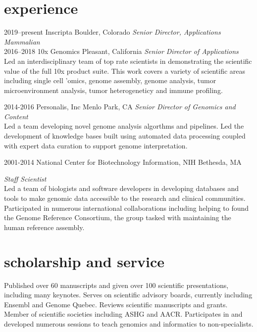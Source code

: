\documentclass[]{dmc-cv} %
\begin{document}
\section{experience}

\begin{entrylist}


\entry
{2019--present}
{Inscripta}
{Boulder, Colorado}
{\emph{Senior Director, Applications Mammalian}}\\

\entry
{2016--2018}
{10x Genomics}
{Pleasant, California}
{\emph{Senior Director of Applications} \\
Led an interdisciplinary team of top rate scientists in demonstrating the scientific value of the full
10x product suite. This work covers a variety of scientific areas including single cell 'omics, genome assembly, genome analysis,
tumor microenvironment analysis, tumor heterogeneticy and immune profiling.
}

\entry
{2014-2016}
{Personalis, Inc}
{Menlo Park, CA}
{\emph{Senior Director of Genomics and Content} \\
Led a team developing novel genome analysis algorthms and pipelines. Led the development of knowledge bases built using automated data processing coupled with expert data curation to support genome interpretation.
}

\entry
{2001-2014}
{National Center for Biotechnology Information, NIH}
{Bethesda, MA}
{\emph{Staff Scientist} \\
Led a team of biologists and software developers in developing databases and tools to make genomic data accessible to the research and clinical communities. Participated in numerous international collaborations including helping to found the Genome Reference Consortium, the group tasked with maintaining the human reference assembly.

}

\end{entrylist}


\section{scholarship and service}
Published over 60 manuscripts and given over 100 scientific presentations, including many keynotes. Serves on scientific advisory boards, currently including Ensembl and Genome Quebec. Reviews scientific manuscripts and grants. Member of scientific societies including ASHG and AACR. Participates in and developed numerous sessions to teach genomics and informatics to non-specialists.
\end{document}
